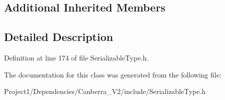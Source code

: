 \subsection*{Additional Inherited Members}


\subsection{Detailed Description}


Definition at line 174 of file Serializable\+Type.\+h.



The documentation for this class was generated from the following file\+:\begin{DoxyCompactItemize}
\item 
Project1/\+Dependencies/\+Canberra\+\_\+\+V2/include/Serializable\+Type.\+h\end{DoxyCompactItemize}
